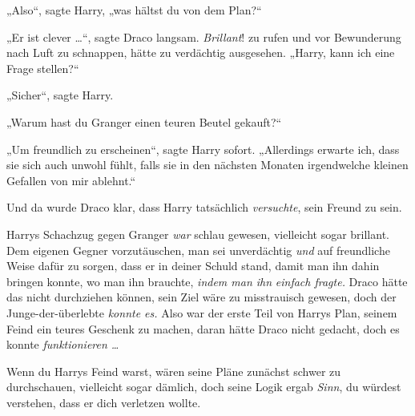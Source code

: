 „Also“, sagte Harry, „was hältst du von dem Plan?“

„Er ist clever …“, sagte Draco langsam. \emph{Brillant}! zu rufen und vor Bewunderung nach Luft zu schnappen, hätte zu verdächtig ausgesehen.
„Harry, kann ich eine Frage stellen?“

„Sicher“, sagte Harry.

„Warum hast du Granger einen teuren Beutel gekauft?“

„Um freundlich zu erscheinen“, sagte Harry sofort.
„Allerdings erwarte ich, dass sie sich auch unwohl fühlt, falls sie in den nächsten Monaten irgendwelche kleinen Gefallen von mir ablehnt.“

Und da wurde Draco klar, dass Harry tatsächlich \emph{versuchte}, sein Freund zu sein.

Harrys Schachzug gegen Granger \emph{war} schlau gewesen, vielleicht sogar brillant. Dem eigenen Gegner vorzutäuschen, man sei unverdächtig \emph{und} auf freundliche Weise dafür zu sorgen, dass er in deiner Schuld stand, damit man ihn dahin bringen konnte, wo man ihn brauchte, \emph{indem man ihn} \emph{einfach fragte.} Draco hätte das nicht durchziehen können, sein Ziel wäre zu misstrauisch gewesen, doch der Junge-der-überlebte \emph{konnte es.} Also war der erste Teil von Harrys Plan, seinem Feind ein teures Geschenk zu machen, daran hätte Draco nicht gedacht, doch es konnte \emph{funktionieren …}

Wenn du Harrys Feind warst, wären seine Pläne zunächst schwer zu durchschauen, vielleicht sogar dämlich, doch seine Logik ergab \emph{Sinn}, du würdest verstehen, dass er dich verletzen wollte.


